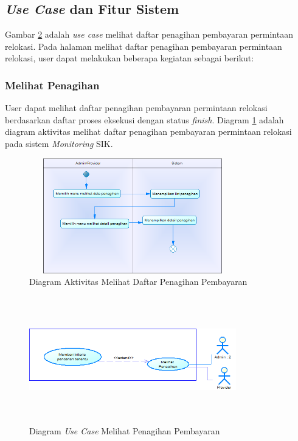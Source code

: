 \subsection{\textit{Use Case} dan Fitur Sistem}
Gambar \ref{figure:use_case_melihat_penagihan} adalah \textit{use case} melihat daftar penagihan pembayaran permintaan relokasi. Pada halaman melihat daftar penagihan pembayaran permintaan relokasi, user dapat melakukan beberapa kegiatan sebagai berikut:
	\subsubsection{Melihat Penagihan}
	User dapat melihat daftar penagihan pembayaran permintaan relokasi berdasarkan daftar proses eksekusi dengan status \textit{finish}. Diagram \ref{figure:activity_melihat_penagihan} adalah diagram aktivitas melihat daftar penagihan pembayaran permintaan relokasi pada sistem \textit{Monitoring} SIK.
	
	\begin{figure}[h!]
	\centerline {\includegraphics[width=9cm,height=5cm]{bab4/ActivityDiagram_MelihatPenagihan.png}}
	\caption{Diagram Aktivitas Melihat Daftar Penagihan Pembayaran}
	\label{figure:activity_melihat_penagihan}
	\end{figure}

	\begin{figure}[h!]
	\centerline
	{\includegraphics[width=9cm,height=5.5cm]{bab4/use-case-melihat-penagihan.png}}
	\caption{Diagram \textit{Use Case} Melihat Penagihan Pembayaran}
	\label{figure:use_case_melihat_penagihan}
	\end{figure}
	
